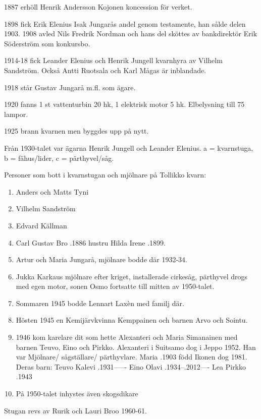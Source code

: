 1887 erhöll Henrik Andersson Kojonen koncession för verket.

1898 fick Erik Elenius Isak Jungarås andel genom testamente, han sålde delen 1903. 1908 avled Nils Fredrik Nordman och hans del sköttes av bankdirektör Erik Söderström som konkursbo.

1914-18 fick Leander Elenius och Henrik Jungell kvarnhyra av Vilhelm Sandström. Också Antti Ruotsala och Karl Mågas är inblandade.

1918 står Gustav Jungarå m.fl. som ägare.

1920 fanns 1 st vattenturbin 20 hk, 1 elektrisk motor 5 hk. Elbelysning till 75 lampor.

1925 brann kvarnen men byggdes upp på nytt.

Från 1930-talet var ägarna Henrik Jungell och Leander Elenius.
a = kvarnstuga, b = fähus/lider, c = pärthyvel/såg.

Personer som bott i kvarnstugan och mjölnare på Tollikko kvarn:
\begin{enumerate}
  \item Anders och Matts Tyni
  \item Vilhelm Sandström
  \item Edvard Källman
  \item Carl Gustav Bro .1886 hustru Hilda Irene .1899.
  \item Artur och Maria Jungarå, mjölnare bodde där 1932-34.
  \item Jukka Karkaus mjölnare efter kriget, installerade cirkesåg, pärthyvel drogs med egen motor, sonen Osmo fortsatte till mitten av 1950-talet.
  \item Sommaren 1945 bodde Lennart Laxèn med familj där.
  \item Hösten 1945 en Kemijärvkvinna Kemppainen och barnen Arvo och Sointu.
  \item 1946 kom karelare dit som hette Alexanteri och Maria Simanainen med barnen Teuvo, Eino och Pirkko.
  Alexanteri  i Suitsamo dog i Jeppo 1952. Han var Mjölnare/ sågställare/ pärthyvlare.
  Maria .1903 född Ikonen dog 1981. Deras barn: Teuvo Kalevi .1931------ Eino Olavi .1934--.2012---- Lea Pirkko .1943
  \item På 1950-talet inhystes även skogsdikare
\end{enumerate}
Stugan revs av Rurik och Lauri Broo 1960-61.



